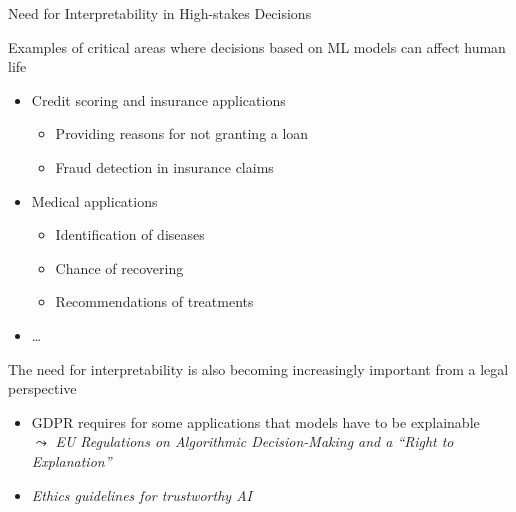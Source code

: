 \documentclass[11pt,compress,t,notes=noshow, aspectratio=169, xcolor=table]{beamer}
\begin{document}
\begin{frame}{Need for Interpretability in High-stakes Decisions}

Examples of critical areas where decisions based on ML models can affect human life 
    \begin{itemize}
        
        \item Credit scoring and insurance applications
        \begin{itemize}
            \item Providing reasons for not granting a loan
            \item Fraud detection in insurance claims
        \end{itemize}
\pause
        \item Medical applications %
        \begin{itemize}
            \item Identification of diseases
            \item Chance of recovering
            \item Recommendations of treatments
        \end{itemize}
\pause

        \item \ldots
    \end{itemize}
    
    \pause
    The need for interpretability is also becoming increasingly important from a legal perspective
    
    \begin{itemize}
    \item GDPR requires for some applications that models have to be explainable \\
    $\leadsto$ \textit{EU Regulations on Algorithmic Decision-Making and a ``Right to Explanation''} 
    
    \item \textit{Ethics guidelines for trustworthy AI}

    \end{itemize}
\end{frame}
\end{document}
